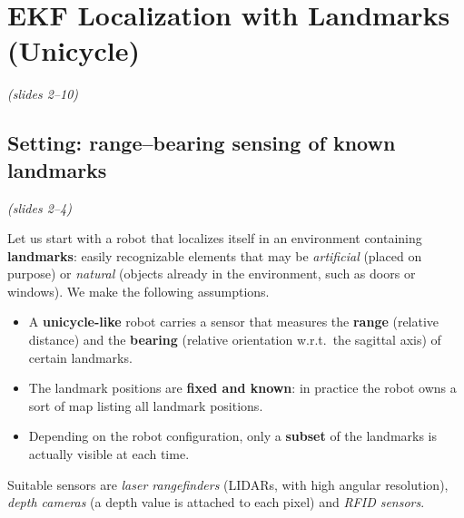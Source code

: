 \documentclass[11pt,a4paper]{article}
\theoremstyle{definition}
\theoremstyle{plain}
\theoremstyle{remark}
\newcommand{\slides}[1]{\par\vspace{-2pt}\noindent\emph{(slides #1)}\par\smallskip}
\begin{document}
\section{EKF Localization with Landmarks (Unicycle)}
\slides{2--10}

\subsection{Setting: range--bearing sensing of known landmarks}
\slides{2--4}

Let us start with a robot that localizes itself in an environment containing \textbf{landmarks}: easily recognizable elements that may be \emph{artificial} (placed on purpose) or \emph{natural} (objects already in the environment, such as doors or windows). We make the following assumptions.
\begin{itemize}
  \item A \textbf{unicycle-like} robot carries a sensor that measures the \textbf{range} (relative distance) and the \textbf{bearing} (relative orientation w.r.t.\ the sagittal axis) of certain landmarks.
  \item The landmark positions are \textbf{fixed and known}: in practice the robot owns a sort of map listing all landmark positions.
  \item Depending on the robot configuration, only a \textbf{subset} of the landmarks is actually visible at each time.
\end{itemize}
Suitable sensors are \emph{laser rangefinders} (LIDARs, with high angular resolution), \emph{depth cameras} (a depth value is attached to each pixel) and \emph{RFID sensors}.
\end{document}
